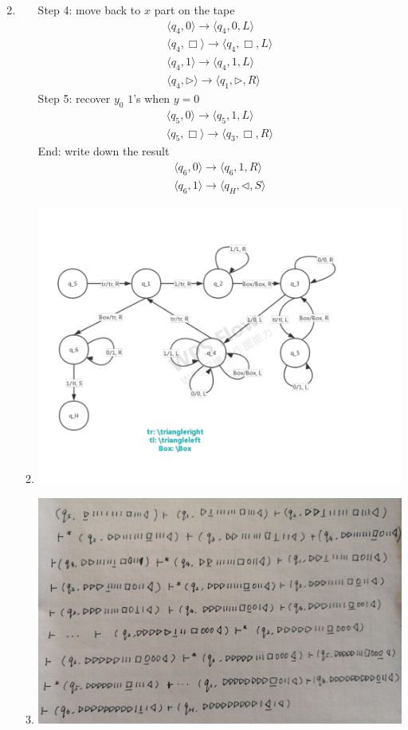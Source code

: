 \documentclass[12pt,a4paper]{article}
\makeatletter
\newtheorem*{solution}{Solution}
\theoremstyle{definition}
\renewenvironment{solution}[1][Solution] {\par\pushQED{\qed}\normalfont\topsep6\p@\@plus6\p@\relax\trivlist\item[\hskip\labelsep\bfseries#1\@addpunct{.}]\ignorespaces}{\popQED\endtrivlist\@endpefalse} \makeatother
\makeatother
\begin{document}
\begin{enumerate}
\begin{solution}
\begin{enumerate}
		Step 4: move back to $x$ part on the tape
		\begin{gather*}
			\langle q_4,0\rangle\rightarrow\langle q_4,0,L\rangle \\
			\langle q_4,\Box\rangle\rightarrow\langle q_4,\Box,L\rangle \\
			\langle q_4,1\rangle\rightarrow\langle q_4,1,L\rangle \\
			\langle q_4,\triangleright\rangle\rightarrow\langle q_1,\triangleright,R\rangle
		\end{gather*}
		Step 5: recover $y_0$ $1$'s when $y=0$
		\begin{gather*}
		\langle q_5,0\rangle\rightarrow\langle q_5,1,L\rangle \\
		\langle q_5,\Box\rangle\rightarrow\langle q_3,\Box,R\rangle
		\end{gather*}
		End: write down the result
		\begin{gather*}
			\langle q_6,0\rangle\rightarrow\langle q_6,1,R\rangle \\
			\langle q_6,1\rangle\rightarrow\langle q_H,\triangleleft,S\rangle
		\end{gather*}
		\item
		\hfill \break
		\includegraphics[scale=0.5]{state_trans}
		\item
		\hfill \break
		\includegraphics[scale=0.22]{sol_1c}
	\end{enumerate}
\end{solution}


\end{enumerate}
\end{document}
